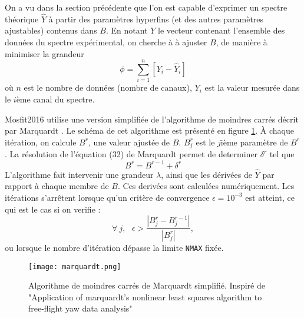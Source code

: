 On a vu dans la section précédente que l'on est capable d'exprimer un spectre théorique $\widehat{Y}$ à partir des paramètres hyperfins (et des autres paramètres ajustables) contenus dans $B$.
En notant $Y$ le vecteur contenant l'ensemble des données du spectre expérimental, on cherche à à ajuster $B$, de manière à minimiser la grandeur 
\begin{equation}
\phi = \sum^{n}_{i=1} \left[Y_i - \widehat{Y}_i\right]
\end{equation}
où $n$ est le nombre de données (nombre de canaux), $Y_i$ est la valeur mesurée dans le $i$ème canal du spectre.

Mosfit2016 utilise une version simplifiée de l'algorithme de moindres carrés décrit par Marquardt \cite{marquardt}.
Le schéma de cet algorithme est présenté en figure \ref{fig:marquardt}.
À chaque itération, on calcule $B^r$, une valeur ajustée de $B$. $B^r_j$ est le $j$ième paramètre de $B^r$. 
 La résolution de l'équation (32) de Marquardt\cite{marquardt} permet de determiner $\delta^r$ tel que 
\begin{equation}
  B^r = B^{r-1} + \delta^r 
\end{equation}
L'algorithme fait intervenir une grandeur $\lambda$, ainsi que les dérivées de $\hat{Y}$ par rapport à chaque membre de $B$.
Ces derivées sont calculées numériquement.
Les itérations s'arrêtent lorsque qu'un critère de convergence $\epsilon=10^{-3}$ est atteint, ce qui est le cas si on verifie :
\begin{equation}
 \forall~j,~~~\epsilon > \frac{|B^r_j - B^{r-1}_j|}{|B^r_j|},
\end{equation} 
ou lorsque le nombre d'itération dépasse la limite \lstinline{NMAX} fixée.


\begin{figure}
\texttt{[image: marquardt.png]}
\caption{\label{fig:marquardt}Algorithme de moindres carrés de Marquardt simplifié. Inspiré de "Application of marquardt's nonlinear least squares
algorithm to free-flight yaw data analysis"}
\end{figure}

